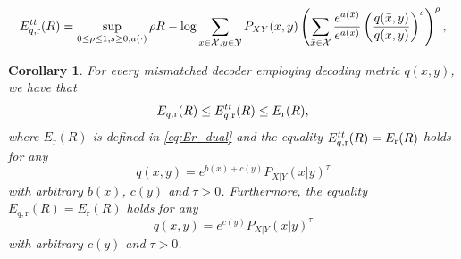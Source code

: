 \documentclass[10pt,a4paper]{amsart}
\newtheorem{corollary}{Corollary}
\newcommand{\Xc}{\mathcal{X}}
\newcommand{\Yc}{\mathcal{Y}}
\begin{document}
\begin{equation}
	E^{\rm tt}_{q,\mathrm{r}}(R) = \sup_{0\leq\rho\leq 1,s\geq 0,a(\cdot)}\rho R-\log\sum\limits_{x\in\Xc,y\in\Yc}P_{XY}(x,y)\left(\sum\limits_{\bar{x}\in\Xc}\frac{e^{a(\bar{x})}}{e^{a(x)}}\left(\frac{q(\bar{x},y)}{q(x,y)}\right)^s\right)^{\rho},\label{eqn:exp_Type_RC}
\end{equation}

\begin{corollary}
	For every mismatched decoder employing decoding metric $q(x,y)$, we have that
	\begin{equation}
		E_{q,\mathrm{r}}(R) \leq E^{\rm tt}_{q,\mathrm{r}}(R) \leq E_{\mathrm{r}}(R),\label{eqn:RC_exponent_inequalities}
	\end{equation}
	where $E_{\mathrm{r}}(R)$ is defined in \eqref{eq:Er_dual} and the equality $E^{\rm tt}_{q,\mathrm{r}}(R)=E_{\mathrm{r}}(R)$ holds for any
	\begin{equation}
		q(x,y)=e^{b(x)+c(y)}P_{X|Y}(x|y)^{\tau}\label{eqn:RC_Type_optimal_decoders}
	\end{equation}
	with arbitrary $b(x)$, $c(y)$ and $\tau>0$. Furthermore, the equality $E_{q,\mathrm{r}}(R)=E_{\mathrm{r}}(R)$ holds for any
	\begin{equation}
		q(x,y)=e^{c(y)}P_{X|Y}(x|y)^{\tau}\label{eqn:RC_St_optimal_decoders}
	\end{equation}
	with arbitrary $c(y)$ and $\tau>0$.
		
	\label{cor:RC_exponent_comparison}
\end{corollary}
\end{document}
